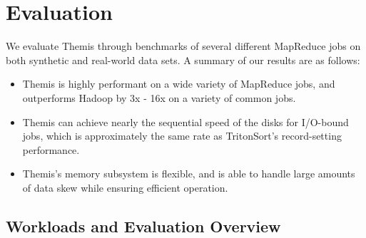\section{Evaluation}
\label{sec:eval}

We evaluate Themis through benchmarks of several different MapReduce jobs on
both synthetic and real-world data sets.  A summary of
our results are as follows:

\begin{itemize}
  \item Themis is highly performant on a wide variety of MapReduce jobs, and
    outperforms Hadoop by 3x - 16x on a variety of common jobs.
  \item Themis can achieve nearly the sequential speed of the
  disks for I/O-bound jobs, which is approximately the same rate as TritonSort's
  record-setting performance.
  \item Themis's memory subsystem is flexible, and is able to handle
  large amounts of data skew while ensuring efficient operation.
\end{itemize}

\subsection{Workloads and Evaluation Overview}
\label{sec:methodology}

